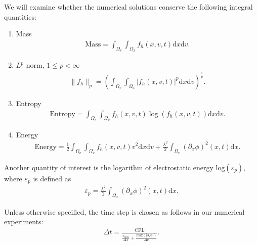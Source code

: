\documentclass[letterpaper,10pt]{article}
\numberwithin{equation}{section}
\numberwithin{figure}{section}
\numberwithin{table}{section}
\begin{document}
We will examine whether the numerical solutions conserve the following
integral quantities:
\begin{enumerate}
    \item Mass
    \begin{align*}
        \text{Mass} = \int_{\Omega_v}\int_{\Omega_x}f_h(x,v,t)\mathrm dx\mathrm dv.
    \end{align*}
    \item $L^p$ norm, $1\leq p < \infty$
    \begin{align*}
        \|f_h\|_p = \left(\int_{\Omega_v}\int_{\Omega_x}|f_h(x,v,t)|^p\mathrm dx\mathrm dv \right)^{\frac{1}{p}}.
    \end{align*}
    \item Entropy
    \begin{align*}
        \text{Entropy} = \int_{\Omega_v}\int_{\Omega_x}f_h(x,v,t)\log(f_h(x,v,t))\mathrm dx\mathrm dv.
    \end{align*}
    \item Energy
    \begin{align*}
        \text{Energy} = \frac{1}{2}\int_{\Omega_v}\int_{\Omega_x}f_h(x,v,t)v^2\mathrm dx\mathrm dv+\frac{\lambda^2}{2}\int_{\Omega_x}(\partial_x\phi)^2(x,t)\mathrm dx.
    \end{align*}
\end{enumerate}
Another quantity of interest is the logarithm of electrostatic energy $\text{log}(\varepsilon_p)$, where $\varepsilon_p$ is defined as
\begin{align*}
    \varepsilon_p = \frac{\lambda^2}{2}\int_{\Omega_x}(\partial_x\phi)^2(x,t)\mathrm dx.
\end{align*}


Unless otherwise specified, the time step is chosen as follows in our numerical experiments:
\begin{align}\label{dt}
    \Delta t = \frac{\text{CFL}}{\frac{v_{\text{max}}}{\Delta x}+\frac{\text{max}(|\partial_x\phi|)}{\Delta v}}.
\end{align}
\end{document}

